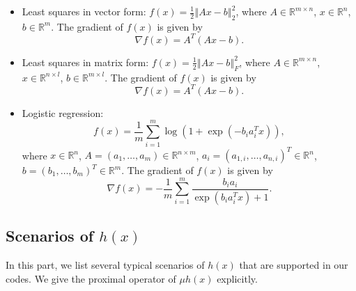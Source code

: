 \documentclass[a4paper]{article}
\newcommand{\norm}[1]{\left\Vert#1\right\Vert}
\newcommand{\mr}{\mathbb{R}}
\begin{document}
  \begin{itemize}
    \item {Least squares in vector form:} $f(x) = \frac{1}{2} 
    \norm{Ax - b}_2^2$, where $A \in \mr^{m \times n}$, $x \in 
    \mr^n$, 
    $b 
    \in \mr^m$. The gradient of $f(x)$ is given by %
    \begin{displaymath}
      \nabla f(x) = A^T (A x - b).
    \end{displaymath}
    
    \item {Least squares in matrix form:} $f(x) = \frac{1}{2} 
    \norm{Ax - b}_F^2$, where $A \in \mr^{m \times n}$, $x \in \mr^{n 
      \times l}$, $b \in \mr^{m \times l}$. The gradient of $f(x)$ is 
    given 
    by
    \begin{displaymath}
      \nabla f(x) = A^T  (A x - b).
    \end{displaymath}
    
    \item {Logistic regression:} 
    \begin{displaymath}
      f(x) = \frac{1}{m} \sum_{i = 1}^{m} \log(1 + \exp(- b_i a_i^T 
      x)),
    \end{displaymath}
    where $x \in \mr^n$, $A = (a_1, \ldots, a_m) \in \mr^{n \times 
      m}$, 
    $a_i = (a_{1,i}, \ldots, a_{n,i})^T \in \mr^n$,
    $b = (b_1, \ldots, b_m)^T \in \mr^m$. The gradient of $f(x)$ is 
    given 
    by
    \begin{displaymath}
      \nabla f(x) = - \frac{1}{m} \sum_{i = 1}^{m} \frac{b_i 
        a_i}{\exp(b_i a_i^T x) + 1}.
    \end{displaymath}
  \end{itemize}
  
  
  
  \subsection{Scenarios of $h(x)$}
  \label{sec:cal_h}
  In this part, we list several typical scenarios of $h(x)$ that are 
  supported in our codes. We give the proximal operator of $\mu h(x)$ 
  explicitly.
  
\end{document}
